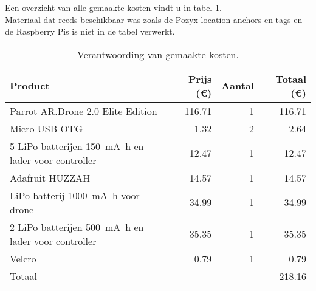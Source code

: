 Een overzicht van alle gemaakte kosten vindt u in tabel \ref{tab:kosten}.\\
Materiaal dat reeds beschikbaar was zoals de Pozyx location anchors en tags en de Raspberry Pis is niet in de tabel verwerkt.
\begin{table}[p]
\centering
\begin{tabular}{ |l|r|r|r| } \hline
Product & Prijs (\euro{}) & Aantal & Totaal (\euro{}) \\ [.5ex] \hline \hline
Parrot AR.Drone 2.0 Elite Edition & 116.71 & 1 & 116.71 \\ \hline
Micro USB OTG & 1.32 & 2 & 2.64 \\ \hline
5 LiPo batterijen \SI{150}{\mA\hour} en lader voor controller & 12.47 & 1 & 12.47 \\ \hline
Adafruit HUZZAH & 14.57 & 1 & 14.57 \\ \hline
LiPo batterij \SI{1000}{\mA\hour} voor drone & 34.99 & 1 & 34.99 \\ \hline
2 LiPo batterijen \SI{500}{\mA\hour} en lader voor controller & 35.35 & 1 & 35.35 \\ [.5ex] \hline
Velcro & 0.79 & 1 & 0.79 \\ \hline
\hline
Totaal & & & 218.16 \\ \hline
\end{tabular}
\caption[Kosten]{Verantwoording van gemaakte kosten.}
\label{tab:kosten}
\end{table}
